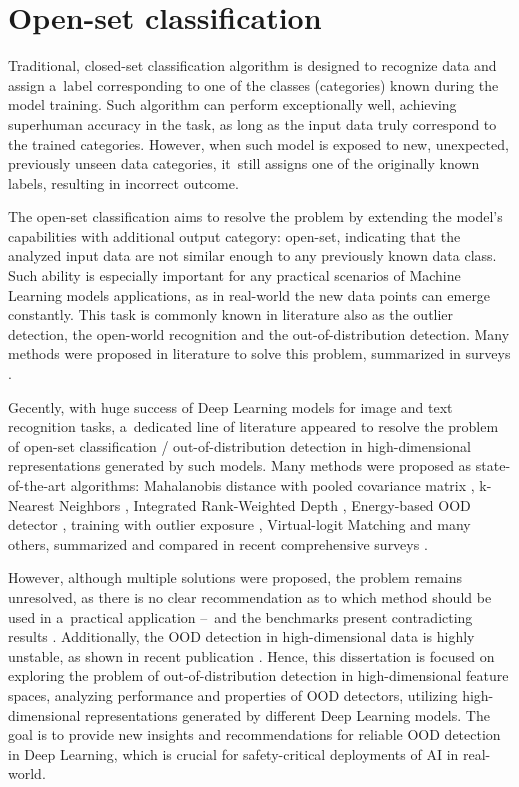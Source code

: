 \section{Open-set classification}
\label{section:open-set-classification}

Traditional, closed-set classification algorithm is designed to recognize data and assign a~label corresponding to one of the classes (categories) known during the model training. Such algorithm can perform exceptionally well, achieving superhuman accuracy in the task, as long as the input data truly correspond to the trained categories. However, when such model is exposed to new, unexpected, previously unseen data categories, it~still assigns one of the originally known labels, resulting in incorrect outcome.

The open-set classification aims to resolve the problem by extending the model's capabilities with additional output category: open-set, indicating that the analyzed input data are not similar enough to any previously known data class. Such ability is especially important for any practical scenarios of Machine Learning models applications, as in real-world the new data points can emerge constantly. This task is commonly known in literature also as the outlier detection, the open-world recognition and the out-of-distribution detection. Many methods were proposed in literature to solve this problem, summarized in surveys \cite{Hodge-2004}\cite{Chandola-2009}.

Gecently, with huge success of Deep Learning models for image and text recognition tasks, a~dedicated line of literature appeared to resolve the problem of open-set classification / out-of-distribution detection in high-dimensional representations generated by such models. Many methods were proposed as state-of-the-art algorithms: Mahalanobis distance with pooled covariance matrix \cite{Lee-2018}, k-Nearest Neighbors \cite{Sun-2022}, Integrated Rank-Weighted Depth \cite{Colombo-2022}, Energy-based OOD detector \cite{Liu-2020},
training with outlier exposure \cite{Hendrycks-2019}, Virtual-logit Matching \cite{Wang-2022} and many others, summarized and compared in recent comprehensive surveys \cite{Geng-2021}\cite{Yang-2022}.

However, although multiple solutions were proposed, the problem remains unresolved, as there is no clear recommendation as to which method should be used in a~practical application –~and the benchmarks present contradicting results \cite{Tajwar-2021}\cite{Yang-2022}. Additionally, the OOD detection in high-dimensional data is highly unstable, as shown in recent publication \cite{Szyc-2023}. Hence, this dissertation is focused on exploring the problem of out-of-distribution detection in high-dimensional feature spaces, analyzing performance and properties of OOD detectors, utilizing high-dimensional representations generated by different Deep Learning models. The goal is to provide new insights and recommendations for reliable OOD detection in Deep Learning, which is crucial for safety-critical deployments of AI in real-world.


